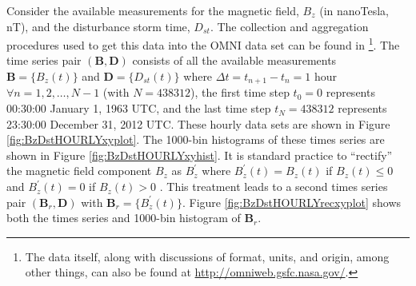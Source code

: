 Consider the available measurements for the magnetic field, $B_z$ (in nanoTesla, nT), and the disturbance storm time, $D_{st}$.  The collection and aggregation procedures used to get this data into the OMNI data set can be found in \cite{King2005}\footnote{The data itself, along with discussions of format, units, and origin, among other things, can also be found at \url{http://omniweb.gsfc.nasa.gov/}.}.  The time series pair $(\mathbf{B},\mathbf{D})$ consists of all the available measurements $\mathbf{B} =\{B_z(t)\}$ and $\mathbf{D}=\{D_{st}(t)\}$ where $\Delta t=t_{n+1}-t_n=1$ hour $\forall n=1,2,\ldots,N-1$ (with $N=438312$), the first time step $t_0=0$ represents 00:30:00 January 1, 1963 UTC, and the last time step $t_N = 438312$ represents 23:30:00 December 31, 2012 UTC.  These hourly data sets are shown in Figure \ref{fig:BzDstHOURLYxyplot}.  The 1000-bin histograms of these times series are shown in Figure \ref{fig:BzDstHOURLYxyhist}.  It is standard practice to ``rectify'' the magnetic field component $B_z$ as $B_z^\prime$ where $B_z^\prime(t) = B_z(t)$ if $B_z(t)\le 0$ and $B_z^\prime(t) = 0$ if $B_z(t)>0$ \cite{Burton1975,Dungey1961}.  This treatment leads to a second times series pair $(\mathbf{B}_r,\mathbf{D})$ with $\mathbf{B}_r = \{B_z^\prime (t)\}$.  Figure \ref{fig:BzDstHOURLYrecxyplot} shows both the times series and 1000-bin histogram of $\mathbf{B}_r$.

